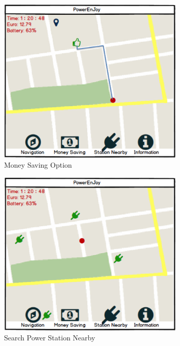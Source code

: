 \documentclass[a4paper,11pt]{article}
\begin{document}
	\begin{figure}[H]
   			\centering
   			\includegraphics[width=0.8\textwidth]{images/optimal}
  	    		\caption{Money Saving Option}\label{fig-optimal}
	\end{figure}
	
	\begin{figure}[H]
   			\centering
   			\includegraphics[width=0.8\textwidth]{images/nearby}
  	    		\caption{Search Power Station Nearby}\label{fig-nearby}
	\end{figure}

	
\newpage
\end{document}

